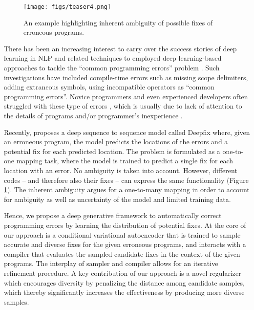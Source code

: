 \documentclass[letterpaper]{article} \usepackage{aaai20}  \usepackage{times}  \usepackage{helvet} \usepackage{courier}  \usepackage[hyphens]{url}  \usepackage{graphicx}
\newcommand{\figref}{Figure}
\begin{document}
\begin{figure}
\centering
    \texttt{[image: figs/teaser4.png]}
    \caption{An example highlighting inherent ambiguity of possible fixes of erroneous programs.}
\label{fig:teaser}
\end{figure}

There has been an increasing interest to carry over the success stories of deep learning in NLP and related techniques to  employed deep learning-based approaches to tackle the ``common programming errors'' problem \cite{Gupta2017DeepFixFC,gupta2019RLAssist}. Such investigations have included compile-time errors such as missing scope delimiters, adding extraneous symbols, using incompatible operators as ``common programming errors''. Novice programmers and even experienced developers often struggled with these type of errors \cite{seo2014programmers}, which is usually due to lack of attention to the details of programs and/or programmer's inexperience \cite{gupta2019RLAssist}.


Recently, \citeauthor{Gupta2017DeepFixFC} proposes a deep sequence to sequence model called Deepfix where, given an erroneous program, the model predicts the locations of the errors and a potential fix for each predicted location. The problem is formulated as a one-to-one mapping task, where the model is trained to predict a single fix for each location with an error. No ambiguity is taken into account. However, different codes -- and therefore also their fixes -- can express the same functionality  (\figref \,\ref{fig:teaser}). The inherent ambiguity argues for a one-to-many mapping in order to account for ambiguity as well as uncertainty of the model and limited training data.




Hence, we propose a deep generative framework to automatically correct programming errors by learning the distribution of potential fixes. At the core of our approach is a conditional variational autoencoder that is trained to sample accurate and diverse fixes for the given erroneous programs, and interacts with a compiler that evaluates the sampled candidate fixes in the context of the given programs. The interplay of sampler and compiler allows for an iterative refinement procedure. A key contribution of our approach is a novel regularizer which encourages diversity by penalizing the distance among candidate samples, which thereby significantly increases the effectiveness by producing more diverse samples. 
\end{document}
